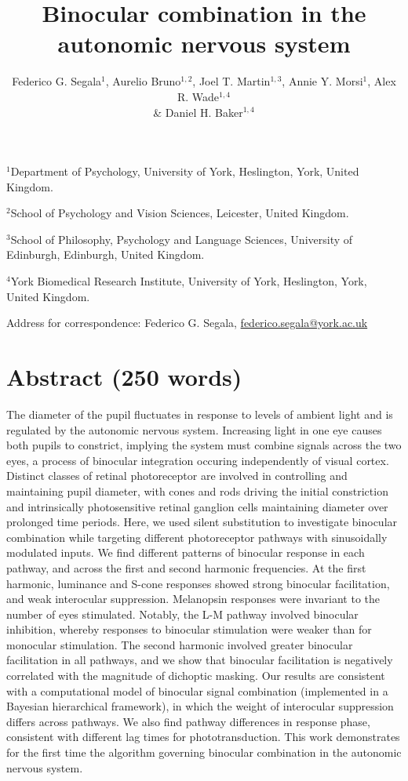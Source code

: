 \documentclass[
]{article}
\title{Binocular combination in the autonomic nervous system}
\author{Federico G. Segala\(^1\), Aurelio Bruno\(^{1,2}\), Joel T. Martin\(^{1,3}\), Annie Y. Morsi\(^1\), Alex R. Wade\(^{1,4}\)\\
\& Daniel H. Baker\(^{1,4}\)}
\date{}
\begin{document}
\maketitle

\(^1\)Department of Psychology, University of York, Heslington, York, United Kingdom.

\(^2\)School of Psychology and Vision Sciences, Leicester, United Kingdom.

\(^3\)School of Philosophy, Psychology and Language Sciences, University of Edinburgh, Edinburgh, United Kingdom.

\(^4\)York Biomedical Research Institute, University of York, Heslington, York, United Kingdom.

Address for correspondence: Federico G. Segala, \url{federico.segala@york.ac.uk}

\hypertarget{abstract-250-words}{%
\section{Abstract (250 words)}\label{abstract-250-words}}

The diameter of the pupil fluctuates in response to levels of ambient light and is regulated by the autonomic nervous system. Increasing light in one eye causes both pupils to constrict, implying the system must combine signals across the two eyes, a process of binocular integration occuring independently of visual cortex. Distinct classes of retinal photoreceptor are involved in controlling and maintaining pupil diameter, with cones and rods driving the initial constriction and intrinsically photosensitive retinal ganglion cells maintaining diameter over prolonged time periods. Here, we used silent substitution to investigate binocular combination while targeting different photoreceptor pathways with sinusoidally modulated inputs. We find different patterns of binocular response in each pathway, and across the first and second harmonic frequencies. At the first harmonic, luminance and S-cone responses showed strong binocular facilitation, and weak interocular suppression. Melanopsin responses were invariant to the number of eyes stimulated. Notably, the L-M pathway involved binocular inhibition, whereby responses to binocular stimulation were weaker than for monocular stimulation. The second harmonic involved greater binocular facilitation in all pathways, and we show that binocular facilitation is negatively correlated with the magnitude of dichoptic masking. Our results are consistent with a computational model of binocular signal combination (implemented in a Bayesian hierarchical framework), in which the weight of interocular suppression differs across pathways. We also find pathway differences in response phase, consistent with different lag times for phototransduction. This work demonstrates for the first time the algorithm governing binocular combination in the autonomic nervous system.
\end{document}
